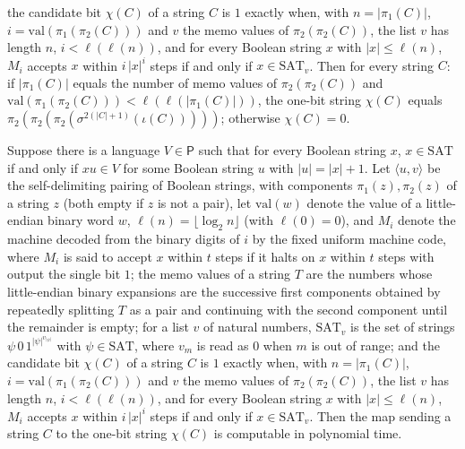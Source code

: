 \begin{theorem}
the candidate bit $\chi(C)$ of a string $C$ is $1$ exactly when, with $n=|\pi_1(C)|$, $i=\mathrm{val}(\pi_1(\pi_2(C)))$ and $v$ the memo values of $\pi_2(\pi_2(C))$, the list $v$ has length $n$, $i<\ell(\ell(n))$, and for every Boolean string $x$ with $|x|\le\ell(n)$, $M_i$ accepts $x$ within $i\,|x|^i$ steps if and only if $x\in\mathrm{SAT}_v$. Then for every string $C$: if $|\pi_1(C)|$ equals the number of memo values of
$\pi_2(\pi_2(C))$ and $\mathrm{val}(\pi_1(\pi_2(C)))<\ell(\ell(|\pi_1(C)|))$, the one-bit string
$\chi(C)$ equals $\pi_2(\pi_2(\pi_2(\sigma^{2(|C|+1)}(\iota(C)))))$; otherwise $\chi(C)=0$.
\end{theorem}

\begin{theorem}
\label{Complexity.ladner_candidate_FP}
\leanok
{}
Suppose there is a language $V\in\mathsf P$ such that for every Boolean string $x$, $x\in\mathrm{SAT}$ if and only if $xu\in V$ for some Boolean string $u$ with $|u|=|x|+1$. Let $\langle u,v\rangle$ be the self-delimiting pairing of Boolean strings, with components $\pi_1(z),\pi_2(z)$ of a string $z$ (both empty if $z$ is not a pair), let $\mathrm{val}(w)$ denote the value of a little-endian binary word $w$, $\ell(n)=\lfloor\log_2 n\rfloor$ (with $\ell(0)=0$), and $M_i$ denote the machine decoded from the binary digits of $i$ by the fixed uniform machine code, where $M_i$ is said to accept $x$ within $t$ steps if it halts on $x$ within $t$ steps with output the single bit $1$; the memo values of a string $T$ are the numbers whose little-endian binary expansions are the successive first components obtained by repeatedly splitting $T$ as a pair and continuing with the second component until the remainder is empty; for a list $v$ of natural numbers, $\mathrm{SAT}_v$ is the set of strings $\psi\,0\,1^{|\psi|^{v_{|\psi|}}}$ with $\psi\in\mathrm{SAT}$, where $v_m$ is read as $0$ when $m$ is out of range; and the candidate bit $\chi(C)$ of a string $C$ is $1$ exactly when, with $n=|\pi_1(C)|$, $i=\mathrm{val}(\pi_1(\pi_2(C)))$ and $v$ the memo values of $\pi_2(\pi_2(C))$, the list $v$ has length $n$, $i<\ell(\ell(n))$, and for every Boolean string $x$ with $|x|\le\ell(n)$, $M_i$ accepts $x$ within $i\,|x|^i$ steps if and only if $x\in\mathrm{SAT}_v$. Then the map sending a
string $C$ to the one-bit string $\chi(C)$ is computable in polynomial time.
\end{theorem}

